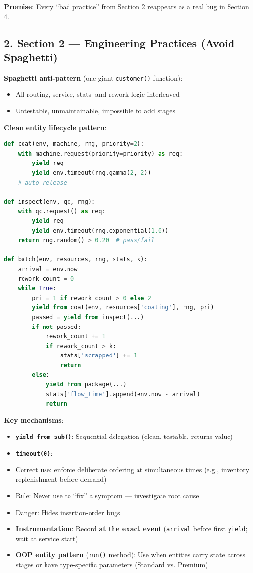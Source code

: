 \documentclass[11pt]{article}
\begin{document}
\textbf{Promise}: Every ``bad practice'' from Section 2 reappears as a real bug in Section 4.

\subsection*{2. Section 2 --- Engineering Practices (Avoid Spaghetti)}

\textbf{Spaghetti anti-pattern} (one giant \texttt{customer()} function):
\begin{itemize}[leftmargin=*]
\item All routing, service, stats, and rework logic interleaved
\item Untestable, unmaintainable, impossible to add stages
\end{itemize}

\textbf{Clean entity lifecycle pattern}:
\begin{lstlisting}[language=Python]
def coat(env, machine, rng, priority=2):
    with machine.request(priority=priority) as req:
        yield req
        yield env.timeout(rng.gamma(2, 2))
    # auto-release

def inspect(env, qc, rng):
    with qc.request() as req:
        yield req
        yield env.timeout(rng.exponential(1.0))
    return rng.random() > 0.20  # pass/fail

def batch(env, resources, rng, stats, k):
    arrival = env.now
    rework_count = 0
    while True:
        pri = 1 if rework_count > 0 else 2
        yield from coat(env, resources['coating'], rng, pri)
        passed = yield from inspect(...)
        if not passed:
            rework_count += 1
            if rework_count > k:
                stats['scrapped'] += 1
                return
        else:
            yield from package(...)
            stats['flow_time'].append(env.now - arrival)
            return
\end{lstlisting}

\textbf{Key mechanisms}:
\begin{itemize}[leftmargin=*]
\item \textbf{\texttt{yield from sub()}}: Sequential delegation (clean, testable, returns value)
\item \textbf{\texttt{timeout(0)}}:
\item Correct use: enforce deliberate ordering at simultaneous times (e.g., inventory replenishment before demand)
\item Rule: Never use to ``fix'' a symptom --- investigate root cause
\item Danger: Hides insertion-order bugs
\item \textbf{Instrumentation}: Record \textbf{at the exact event} (\texttt{arrival} before first \texttt{yield}; wait at service start)
\item \textbf{OOP entity pattern} (\texttt{run()} method): Use when entities carry state across stages or have type-specific parameters (Standard vs. Premium)
\end{itemize}
\end{document}
